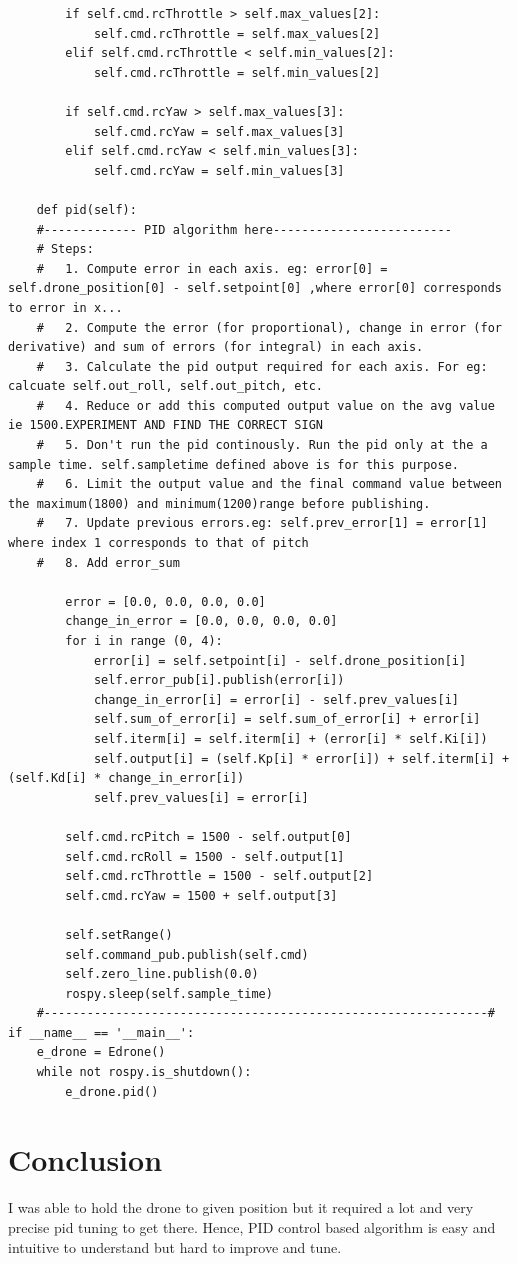 \begin{verbatim}
		if self.cmd.rcThrottle > self.max_values[2]:
		 	self.cmd.rcThrottle = self.max_values[2]
		elif self.cmd.rcThrottle < self.min_values[2]:
		 	self.cmd.rcThrottle = self.min_values[2]

		if self.cmd.rcYaw > self.max_values[3]:
		 	self.cmd.rcYaw = self.max_values[3]
		elif self.cmd.rcYaw < self.min_values[3]:
		 	self.cmd.rcYaw = self.min_values[3]

	def pid(self):
	#------------- PID algorithm here-------------------------
	# Steps:
	# 	1. Compute error in each axis. eg: error[0] = self.drone_position[0] - self.setpoint[0] ,where error[0] corresponds to error in x...
	#	2. Compute the error (for proportional), change in error (for derivative) and sum of errors (for integral) in each axis.
	#	3. Calculate the pid output required for each axis. For eg: calcuate self.out_roll, self.out_pitch, etc.
	#	4. Reduce or add this computed output value on the avg value ie 1500.EXPERIMENT AND FIND THE CORRECT SIGN
	#	5. Don't run the pid continously. Run the pid only at the a sample time. self.sampletime defined above is for this purpose.
	#	6. Limit the output value and the final command value between the maximum(1800) and minimum(1200)range before publishing.
	#	7. Update previous errors.eg: self.prev_error[1] = error[1] where index 1 corresponds to that of pitch
	#	8. Add error_sum
	
		error = [0.0, 0.0, 0.0, 0.0]
		change_in_error = [0.0, 0.0, 0.0, 0.0]
		for i in range (0, 4):
			error[i] = self.setpoint[i] - self.drone_position[i]
			self.error_pub[i].publish(error[i])
			change_in_error[i] = error[i] - self.prev_values[i]
			self.sum_of_error[i] = self.sum_of_error[i] + error[i]
			self.iterm[i] = self.iterm[i] + (error[i] * self.Ki[i])
			self.output[i] = (self.Kp[i] * error[i]) + self.iterm[i] + (self.Kd[i] * change_in_error[i])
			self.prev_values[i] = error[i]
			
		self.cmd.rcPitch = 1500 - self.output[0]
		self.cmd.rcRoll = 1500 - self.output[1]
		self.cmd.rcThrottle = 1500 - self.output[2]
		self.cmd.rcYaw = 1500 + self.output[3]
		
		self.setRange()
		self.command_pub.publish(self.cmd)
		self.zero_line.publish(0.0)
		rospy.sleep(self.sample_time)
	#--------------------------------------------------------------#
if __name__ == '__main__':
	e_drone = Edrone()
	while not rospy.is_shutdown():
		e_drone.pid()
\end{verbatim}

\section{Conclusion}

I was able to hold the drone to given position but it required a lot and very precise pid tuning to get there.
Hence, PID control based algorithm is easy and intuitive to understand but hard to improve and tune.
% 